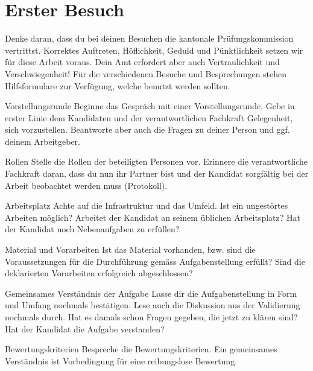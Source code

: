 \section{Erster Besuch}
Denke daran, dass du bei deinen Besuchen die kantonale Prüfungskommission vertrittst. Korrektes Auftreten, Höflichkeit, Geduld und Pünktlichkeit setzen wir für diese Arbeit voraus. Dein Amt erfordert aber auch Vertraulichkeit und Verschwiegenheit! Für die verschiedenen Besuche und Besprechungen stehen Hilfsformulare zur Verfügung, welche benutzt werden sollten.

\begin{taskitem}{Vorstellungsrunde}
  Beginne das Gespräch mit einer Vorstellungsrunde. Gebe in erster Linie dem Kandidaten und der verantwortlichen Fachkraft Gelegenheit, sich vorzustellen. Beantworte aber auch die Fragen zu deiner Person und ggf. deinem Arbeitgeber.
\end{taskitem}
\begin{taskitem}{Rollen}
  Stelle die Rollen der beteiligten Personen vor. Erinnere die verantwortliche Fachkraft daran, dass du nun ihr Partner bist und der Kandidat sorgfältig bei der Arbeit beobachtet werden muss (Protokoll).
\end{taskitem}
\begin{taskitem}{Arbeitsplatz}
  Achte auf die Infrastruktur und das Umfeld. Ist ein ungestörtes Arbeiten möglich? Arbeitet der Kandidat an seinem üblichen Arbeitsplatz? Hat der Kandidat noch Nebenaufgaben zu erfüllen?
\end{taskitem}
\begin{taskitem}{Material und Vorarbeiten}
  Ist das Material vorhanden, bzw. sind die Voraussetzungen für die Durchführung gemäss Aufgabenstellung erfüllt? Sind die deklarierten Vorarbeiten erfolgreich abgeschlossen?
\end{taskitem}
\begin{taskitem}{Gemeinsames Verständnis der Aufgabe}
  Lasse dir die Aufgabenstellung in Form und Umfang nochmals bestätigen. Lese auch die Diskussion aus der Validierung nochmals durch. Hat es damals schon Fragen gegeben, die jetzt zu klären sind? Hat der Kandidat die Aufgabe verstanden?
\end{taskitem}
\begin{taskitem}{Bewertungskriterien}
  Bespreche die Bewertungskriterien. Ein gemeinsames Verständnis ist Vorbedingung für eine reibungslose Bewertung.
\end{taskitem}

